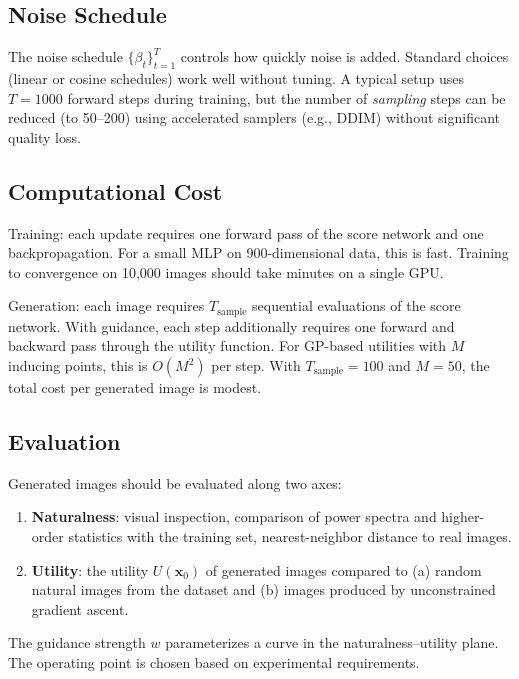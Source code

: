 \documentclass[11pt]{article}
\newcommand{\xb}{\mathbf{x}}
\begin{document}
  \subsection{Noise Schedule}

  The noise schedule $\{\beta_t\}_{t=1}^T$ controls how quickly noise is
  added. Standard choices (linear or cosine schedules) work well without
  tuning. A typical setup uses $T = 1000$ forward steps during training, but
  the number of \emph{sampling} steps can be reduced (to 50--200) using
  accelerated samplers (e.g., DDIM) without significant quality loss.

  \subsection{Computational Cost}

  Training: each update requires one forward pass of the score network and
  one backpropagation. For a small MLP on 900-dimensional data, this is
  fast. Training to convergence on 10,000 images should take minutes on a
  single GPU.

  Generation: each image requires $T_{\mathrm{sample}}$ sequential evaluations
  of the score network. With guidance, each step additionally requires one
  forward and backward pass through the utility function. For GP-based
  utilities with $M$ inducing points, this is $O(M^2)$ per step. With
  $T_{\mathrm{sample}} = 100$ and $M = 50$, the total cost per generated
  image is modest.

  \subsection{Evaluation}

  Generated images should be evaluated along two axes:
  \begin{enumerate}[nosep]
      \item \textbf{Naturalness}: visual inspection, comparison of power
            spectra and higher-order statistics with the training set,
            nearest-neighbor distance to real images.
      \item \textbf{Utility}: the utility $U(\xb_0)$ of generated images
            compared to (a) random natural images from the dataset and
            (b) images produced by unconstrained gradient ascent.
  \end{enumerate}

  The guidance strength $w$ parameterizes a curve in the naturalness--utility
  plane. The operating point is chosen based on experimental requirements.
\end{document}
